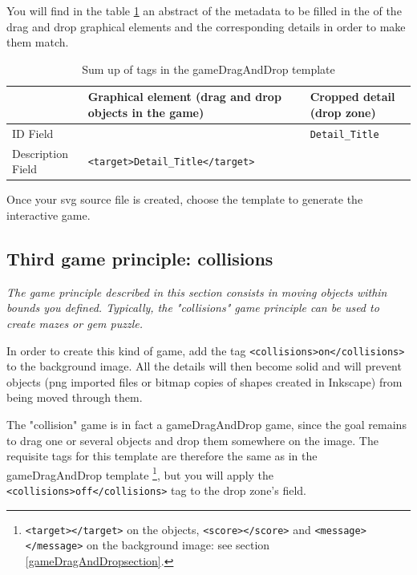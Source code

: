 You will find in the table \ref{tag2_sumup} an abstract of the metadata to be filled in the  
of the drag and drop graphical elements and the corresponding details in order to make them match.

\begin{table}
\begin{tabular}{|p{}|p{2.5in}|p{1.5in}|}
\hline
 & Graphical element (drag and drop objects in the game) & Cropped detail (drop zone)\\
\hline
ID Field & & \verb|Detail_Title|\\
\hline
Description Field & \verb|<target>Detail_Title</target>| & \\
\hline
\end{tabular}
\caption{Sum up of tags in the gameDragAndDrop template}
\label{tag2_sumup}
\end{table}

Once your svg source file is created, choose the template  to generate the interactive game.

\subsection{Third game principle: collisions}

\textit{The game principle described in this section consists in moving objects
within bounds you defined. Typically, the "collisions" game principle
can be used to create mazes or gem puzzle.}


In order to create this kind of game, add the tag \verb|<collisions>on</collisions>| to the 
background image. All the details will then become solid and will prevent objects 
(png imported files or bitmap copies of shapes created in Inkscape) from being moved through them.

The "collision" game is in fact a gameDragAndDrop game, since the goal remains to 
drag one or several objects and drop them somewhere on the image.
The requisite tags for this template are therefore the same as in the gameDragAndDrop
template \footnote{\texttt{<target></target>} on the objects, \texttt{<score></score>} 
and \texttt{<message></message>} on the background image: see section \ref{gameDragAndDropsection}.}, but you 
will apply the \verb|<collisions>off</collisions>| tag to the drop zone's  field.

